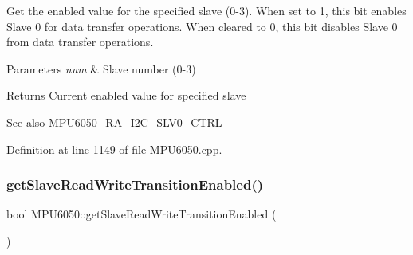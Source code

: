 Get the enabled value for the specified slave (0-\/3). When set to 1, this bit enables Slave 0 for data transfer operations. When cleared to 0, this bit disables Slave 0 from data transfer operations. 
\begin{DoxyParams}{Parameters}
{\em num} & Slave number (0-\/3) \\
\hline
\end{DoxyParams}
\begin{DoxyReturn}{Returns}
Current enabled value for specified slave 
\end{DoxyReturn}
\begin{DoxySeeAlso}{See also}
\mbox{\hyperlink{MPU6050_8h_a70ce4d71982a1e3fb2be9b71f40da786}{M\+P\+U6050\+\_\+\+R\+A\+\_\+\+I2\+C\+\_\+\+S\+L\+V0\+\_\+\+C\+T\+RL}} 
\end{DoxySeeAlso}


Definition at line 1149 of file M\+P\+U6050.\+cpp.


\begin{DoxyCode}{0}

\end{DoxyCode}
\mbox{\label{classMPU6050_a6b3c3aab80fcaa384303f9df2a59d7eb}} 
\subsubsection{\texorpdfstring{getSlaveReadWriteTransitionEnabled()}{getSlaveReadWriteTransitionEnabled()}}
{\footnotesize\ttfamily bool M\+P\+U6050\+::get\+Slave\+Read\+Write\+Transition\+Enabled (\begin{DoxyParamCaption}{ }\end{DoxyParamCaption})}

